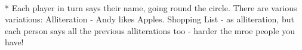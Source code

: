 \begin{minipage}{\textwidth}
\equip{}
\\*
Each player in turn says their name, going round the circle.  There are various variations:
Alliteration - Andy likes Apples.
Shopping List - as alliteration, but each person says all the previous alliterations too - harder the mroe people you have!

\end{minipage}    \vfill
